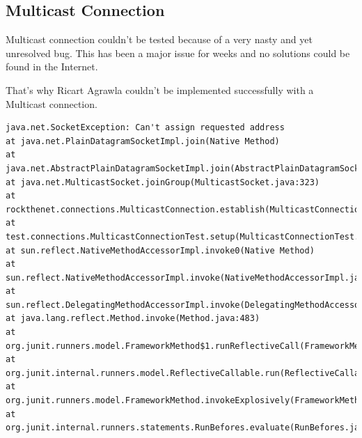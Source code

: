\documentclass[11pt, a4paper]{article}
\begin{document}
\subsection{Multicast Connection}

Multicast connection couldn't be tested because of a very nasty and yet unresolved bug. This has been a major issue for weeks and no solutions could be found in the Internet. 

That's why Ricart Agrawla couldn't be implemented successfully with a Multicast connection. 

\begin{lstlisting}
java.net.SocketException: Can't assign requested address
at java.net.PlainDatagramSocketImpl.join(Native Method)
at java.net.AbstractPlainDatagramSocketImpl.join(AbstractPlainDatagramSocketImpl.java:178)
at java.net.MulticastSocket.joinGroup(MulticastSocket.java:323)
at rockthenet.connections.MulticastConnection.establish(MulticastConnection.java:48)
at test.connections.MulticastConnectionTest.setup(MulticastConnectionTest.java:29)
at sun.reflect.NativeMethodAccessorImpl.invoke0(Native Method)
at sun.reflect.NativeMethodAccessorImpl.invoke(NativeMethodAccessorImpl.java:62)
at sun.reflect.DelegatingMethodAccessorImpl.invoke(DelegatingMethodAccessorImpl.java:43)
at java.lang.reflect.Method.invoke(Method.java:483)
at org.junit.runners.model.FrameworkMethod$1.runReflectiveCall(FrameworkMethod.java:47)
at org.junit.internal.runners.model.ReflectiveCallable.run(ReflectiveCallable.java:12)
at org.junit.runners.model.FrameworkMethod.invokeExplosively(FrameworkMethod.java:44)
at org.junit.internal.runners.statements.RunBefores.evaluate(RunBefores.java:24)
\end{lstlisting}

\nocite{*}

{}
\end{document}
